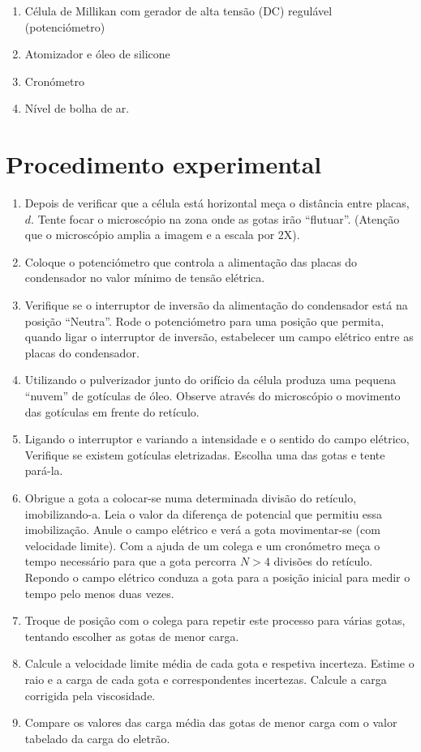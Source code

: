 \documentclass[a4paper,twoside,12pt]{article}      %
\begin{document}
\begin{enumerate}
	\item Célula de Millikan com gerador de alta tensão (DC) regulável (potenciómetro) 
	\item  Atomizador e óleo de silicone 
	\item Cronómetro 
	\item Nível de bolha de ar.%
\end{enumerate}
\section{\sf Procedimento experimental}

\begin{enumerate}
\item   Depois de verificar que a célula está horizontal  meça o distância entre placas, $d$. Tente focar o microscópio na zona onde as gotas irão ``flutuar''. (Atenção que o microscópio amplia a imagem e a escala por 2X).
\item Coloque o potenciómetro que 
controla a alimentação das placas do condensador no valor mínimo de tensão elétrica. 
\item    Verifique se o interruptor de inversão da alimentação do condensador está na posição ``Neutra''.
Rode o potenciómetro para uma posição que permita, quando ligar o interruptor de inversão, estabelecer um campo elétrico entre as placas do condensador. 
\item     Utilizando o pulverizador junto do orifício da célula produza uma pequena ``nuvem'' %
de gotículas de óleo. Observe através do microscópio o movimento das gotículas em 
frente do retículo.
\item     Ligando o interruptor e variando a intensidade  e o  sentido do campo elétrico, Verifique se existem gotículas eletrizadas. Escolha uma das gotas e tente pará-la.
 \item Obrigue a gota a colocar-se numa determinada divisão do retículo, imobilizando-a. 
Leia o valor da diferença de potencial que permitiu essa imobilização. Anule o 
campo elétrico  e verá a gota movimentar-se (com velocidade limite). Com a ajuda de um colega e um 
cronómetro meça o tempo necessário para que a gota percorra  $N>4$ divisões
do retículo. Repondo o campo elétrico conduza a gota para a posição inicial para  medir o tempo pelo menos duas vezes. 
\item Troque de posição com o colega para repetir este processo para várias gotas, tentando escolher as gotas de menor carga.
\item   Calcule a velocidade limite média de cada gota e respetiva incerteza. Estime o raio e 
a carga de cada gota e correspondentes incertezas. Calcule a carga corrigida pela viscosidade.
\item   Compare os valores das carga média das gotas de menor carga  com o valor tabelado da carga do eletrão. 
\end{enumerate}



\end{document}

